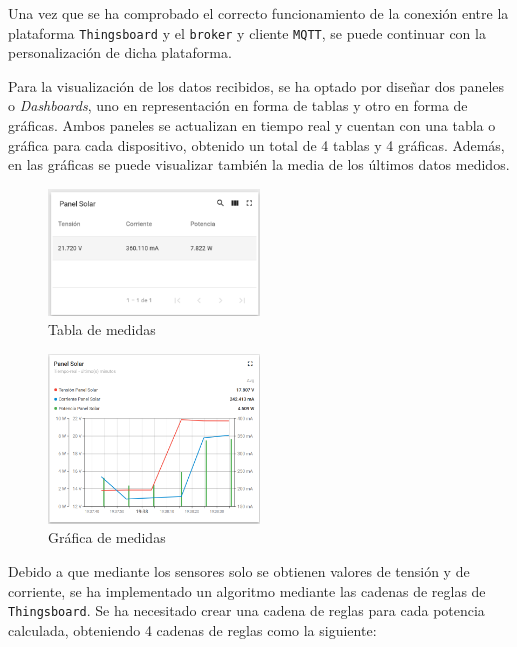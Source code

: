 Una vez que se ha comprobado el correcto funcionamiento de la conexión entre la plataforma \texttt{Thingsboard} y el \texttt{broker} y cliente \texttt{MQTT}, se puede continuar con la personalización de dicha plataforma.

Para la visualización de los datos recibidos, se ha optado por diseñar dos paneles o \textit{Dashboards}, uno en representación en forma de tablas y otro en forma de gráficas. Ambos paneles se actualizan en tiempo real y cuentan con una tabla o gráfica para cada dispositivo, obtenido un total de 4 tablas y 4 gráficas. Además, en las gráficas se puede visualizar también la media de los últimos datos medidos.

\begin{figure}[H]
    \centering
    \includegraphics[width=0.5\textwidth]{images/3-software/3-2-2-thingsboard/TablaThingsBoard.png}
    \caption{Tabla de medidas}
    \label{fig:3-2-2-TablaThingsBoard}
\end{figure}

\begin{figure}[H]
    \centering
    \includegraphics[width=0.5\textwidth]{images/3-software/3-2-2-thingsboard/GraficaThingsBoard.png}
    \caption{Gráfica de medidas}
    \label{fig:3-2-2-GraficaThingsBoard}
\end{figure}

Debido a que mediante los sensores solo se obtienen valores de tensión y de corriente, se ha implementado un algoritmo mediante las cadenas de reglas de \texttt{Thingsboard}. Se ha necesitado crear una cadena de reglas para cada potencia calculada, obteniendo 4 cadenas de reglas como la siguiente:

